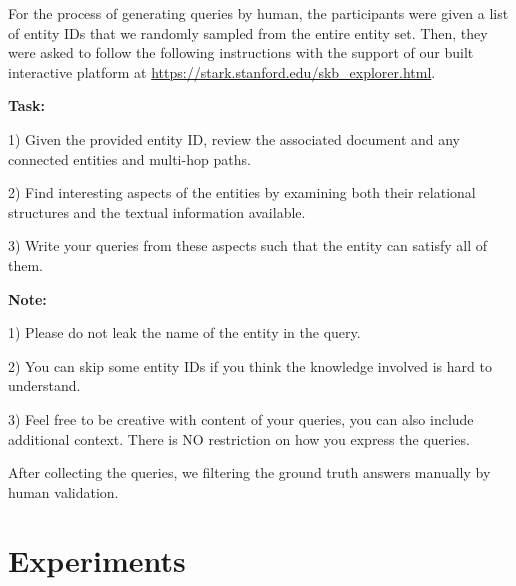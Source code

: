 For the process of generating queries by human, the participants were given a list of entity IDs that we randomly sampled from the entire entity set. Then, they were asked to follow the following instructions with the support of our built interactive platform at {\textcolor{cyan}{\url{https://stark.stanford.edu/skb_explorer.html}}}. 

\vspace{10pt}
\begin{mdframed}[backgroundcolor=gray!10, linecolor=black, linewidth=2pt, innerleftmargin=10pt, innerrightmargin=10pt, innertopmargin=3pt, innerbottommargin=10pt]
\textbf{Task: }

1) Given the provided entity ID, review the associated document and any connected entities and multi-hop paths.

2) Find interesting aspects of the entities by examining both their relational structures and the textual information available.

3) Write your queries from these aspects such that the entity can satisfy all of them. 

\textbf{Note:}

1) Please do not leak the name of the entity in the query. 

2) You can skip some entity IDs if you think the knowledge involved is hard to understand. 

3) Feel free to be creative with content of your queries, you can also include additional context. There is NO restriction on how you express the queries.
\end{mdframed}
After collecting the queries, we filtering the ground truth answers manually by human validation. 

\section{Experiments}




